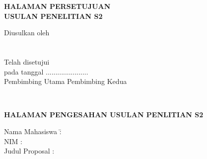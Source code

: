 \newpage
\begin{center}
\begin{singlespace}
\MakeUppercase{\normalfont\large\bfseries\expandafter{HALAMAN PERSETUJUAN}}\\

\vspace{1.0cm}
\MakeUppercase{\normalfont\bfseries\expandafter{USULAN PENELITIAN S2}}\\

\vspace{0.5cm}
\MakeUppercase{\normalfont\bfseries\@titleind}\par\nobreak
{\normalfont\bfseries\@subtitleind}\par\nobreak

\vspace{3.0cm}
Diusulkan oleh\\

\vspace{3cm}
\underline{\@fullname} \\ [.1cm]
\@idnum \\

\vspace{4cm}
Telah disetujui\\
pada tanggal ...................... \@yearsubmit \\ [.5cm]
Pembimbing Utama \hspace{3cm} Pembimbing Kedua

\vspace{1.5cm}
\underline{\@firstsupervisor} \hspace{3cm} \underline{\@secondsupervisor} \\			
\@firstsupervisornip \hspace{3cm} \@secondsupervisornip
\end{singlespace}
\end{center}

\newpage
\begin{center}
\MakeUppercase{\normalfont\large\bfseries\expandafter{HALAMAN PENGESAHAN USULAN PENLITIAN S2}}
\end{center}

\vspace{1.0cm}
\begin{tabbing}
Nama Mahasiswa 	\= : \@fullname \\ [0.2cm]
NIM				\> : \@idnum \\ [0.2cm]
Judul Proposal 	\> : \@titleind
\end{tabbing}
	

